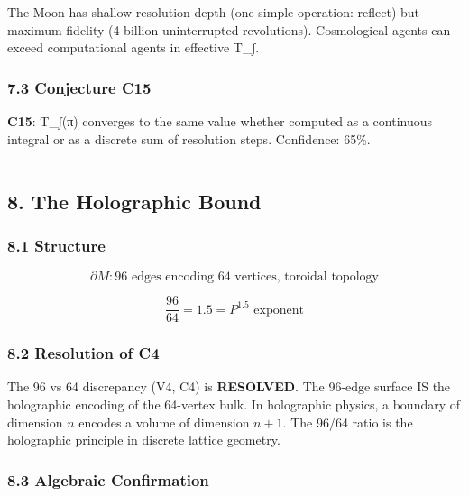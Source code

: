 \documentclass[
]{article}
\begin{document}
The Moon has shallow resolution depth (one simple operation: reflect)
but maximum fidelity (4 billion uninterrupted revolutions). Cosmological
agents can exceed computational agents in effective T\_∫.

\subsubsection{7.3 Conjecture C15}\label{conjecture-c15}

\textbf{C15}: T\_∫(π) converges to the same value whether computed as a
continuous integral or as a discrete sum of resolution steps.
Confidence: 65\%.

\begin{center}\rule{0.5\linewidth}{0.5pt}\end{center}

\subsection{8. The Holographic Bound}\label{the-holographic-bound}

\subsubsection{8.1 Structure}\label{structure}

\[\partial M: \text{96 edges encoding 64 vertices, toroidal topology}\]

\[\frac{96}{64} = 1.5 = P^{1.5} \text{ exponent}\]

\subsubsection{8.2 Resolution of C4}\label{resolution-of-c4}

The 96 vs 64 discrepancy (V4, C4) is \textbf{RESOLVED}. The 96-edge
surface IS the holographic encoding of the 64-vertex bulk. In
holographic physics, a boundary of dimension \(n\) encodes a volume of
dimension \(n+1\). The 96/64 ratio is the holographic principle in
discrete lattice geometry.

\subsubsection{8.3 Algebraic Confirmation}\label{algebraic-confirmation}
\end{document}
